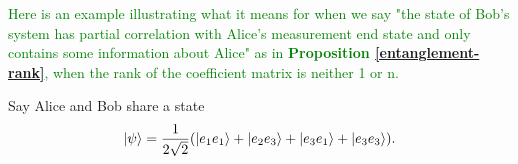 
\textcolor{green}{Here is an example illustrating what it means for when we say "the state of Bob's system has partial correlation with Alice's measurement end state and only contains some information about Alice" as in \textbf{Proposition \ref{entanglement-rank}}, when the rank of the coefficient matrix is neither 1 or n.}
\begin{example}
\label{example rank not full}
Say Alice and Bob share a state $$\ket{\psi}=\frac{1}{2\sqrt{2}}(\ket{e_1 e_1}+\ket{e_2 e_3}+\ket{e_3 e_1}+\ket{e_3 e_3}).$$


\end{example}
